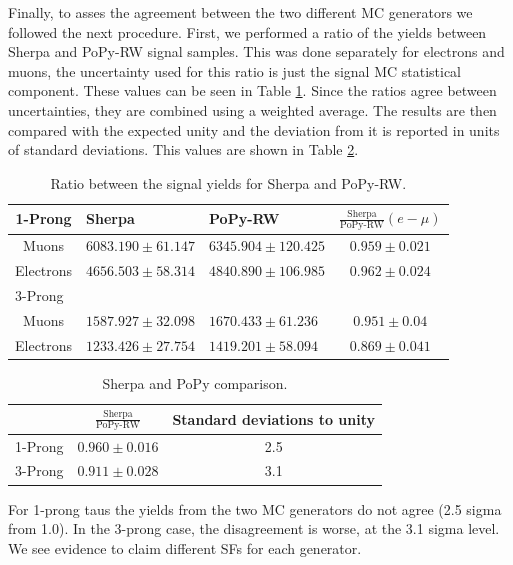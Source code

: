 Finally, to asses the agreement between the two different MC generators we followed the next procedure. First, we performed a ratio of the yields between Sherpa and PoPy-RW signal samples. This was done separately for electrons and muons, the uncertainty used for this ratio is just the signal MC statistical component. These values can be seen in Table \ref{Tab10}. Since the ratios agree between uncertainties, they are combined using a weighted average. The results are then compared with the expected unity and the deviation from it is reported in units of standard deviations. This values are shown in Table \ref{Tab11}.
\begin{table}[]
	\centering
	\begin{tabular}{|c|llc|}
		\hline
		1-Prong                       & \multicolumn{1}{l|}{Sherpa}                & \multicolumn{1}{l|}{PoPy-RW}                & $\frac{\text{Sherpa}}{\text{PoPy-RW}}(e-\mu)$ \\ \hline
		Muons                         & \multicolumn{1}{l|}{$6083.190 \pm 61.147$} & \multicolumn{1}{l|}{$6345.904 \pm 120.425$} & $0.959 \pm 0.021$                             \\ \hline
		Electrons                     & \multicolumn{1}{l|}{$4656.503 \pm 58.314$} & \multicolumn{1}{l|}{$4840.890 \pm 106.985$} & $0.962 \pm 0.024$                             \\ \hline
		\multicolumn{1}{|l|}{3-Prong} & \multicolumn{3}{l|}{}                                                                                                                    \\ \hline
		Muons                         & \multicolumn{1}{l|}{$1587.927 \pm 32.098$} & \multicolumn{1}{l|}{$1670.433 \pm 61.236$}  & $0.951 \pm 0.04$                              \\ \hline
		Electrons                     & \multicolumn{1}{l|}{$1233.426 \pm 27.754$} & \multicolumn{1}{l|}{$1419.201 \pm 58.094$}  & $0.869 \pm 0.041$                             \\ \hline
	\end{tabular}
	\caption{Ratio between the signal yields for Sherpa and PoPy-RW.}
	\label{Tab10}
\end{table}

\begin{table}[]
	\centering
	\begin{tabular}{|c|c|c|}
		\hline
		& $\frac{\text{Sherpa}}{\text{PoPy-RW}}$ & Standard deviations to unity  \\ \hline
		1-Prong & $0.960 \pm 0.016$                                        & 2.5       \\ \hline
		3-Prong & $0.911  \pm 0.028$                                       & 3.1       \\ \hline
	\end{tabular}
	\caption{Sherpa and PoPy comparison.}
	\label{Tab11}
\end{table}		  
For 1-prong taus the yields from the two MC generators do not agree (2.5 sigma from 1.0). In the 3-prong case, the disagreement is worse, at the 3.1 sigma level. We see evidence to claim different SFs for each generator.

